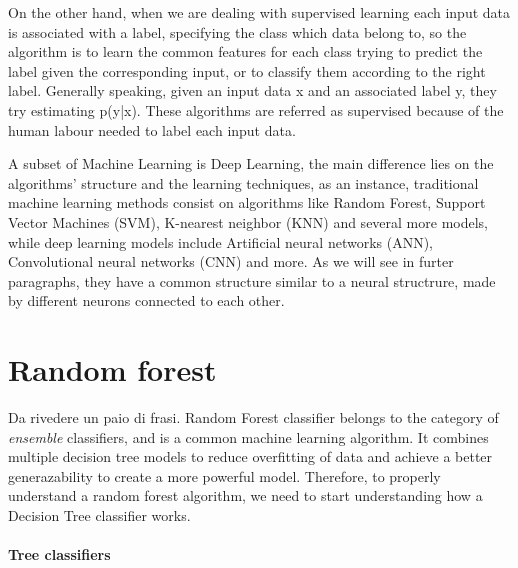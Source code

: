 \documentclass[10pt]{report}
\begin{document}
On the other hand, when we are dealing with supervised learning each input data is associated with a label, specifying the class which data belong to, so the algorithm is to learn the common features for each class trying to predict the label given the corresponding input, or to classify them according to the right label.
Generally speaking, given an input data x and an associated label y, they try estimating p(y|x). These algorithms are referred as supervised because of the human labour needed to label each input data.

A subset of Machine Learning is Deep Learning, the main difference lies on the algorithms' structure and the learning techniques, as an instance, traditional machine learning methods consist on algorithms like Random Forest, Support Vector Machines (SVM), K-nearest neighbor (KNN) and several more models, while deep learning models include Artificial neural networks (ANN), Convolutional neural networks (CNN) and more.
As we will see in furter paragraphs, they have a common structure similar to a neural structrure, made by different neurons connected to each other.




\section{Random forest}
Da rivedere un paio di frasi.
Random Forest classifier belongs to the category of \emph{ensemble} classifiers, and is a common machine learning algorithm.
It combines multiple decision tree models to reduce overfitting of data and achieve a better generazability to create a more powerful model.
Therefore, to properly understand a random forest algorithm, we need to start understanding how a Decision Tree classifier works.

\paragraph{Tree classifiers} \hfill
\end{document}
